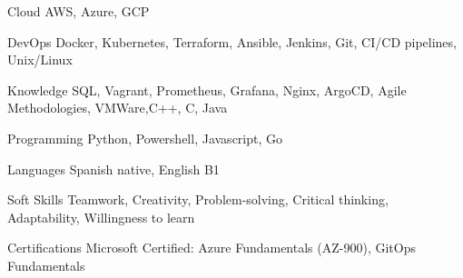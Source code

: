 

\begin{cvskills}

  \cvskill
    {Cloud} %
    {AWS, Azure, GCP} %

  \cvskill
    {DevOps} %
    {Docker, Kubernetes, Terraform, Ansible, Jenkins, Git, CI/CD pipelines,  Unix/Linux} %

  \cvskill
    {Knowledge} %
    {SQL, Vagrant, Prometheus, Grafana, Nginx, ArgoCD, Agile Methodologies, VMWare,C++, C, Java} %

  \cvskill
    {Programming} %
    {Python, Powershell, Javascript, Go} %

  \cvskill
    {Languages} %
    {Spanish native, English B1} %

  \cvskill
    {Soft Skills} %
    {Teamwork, Creativity, Problem-solving, Critical thinking, Adaptability, Willingness to learn} %

  \cvskill
    {Certifications} %
    {Microsoft Certified: Azure Fundamentals (AZ-900), GitOps Fundamentals} %
\end{cvskills}